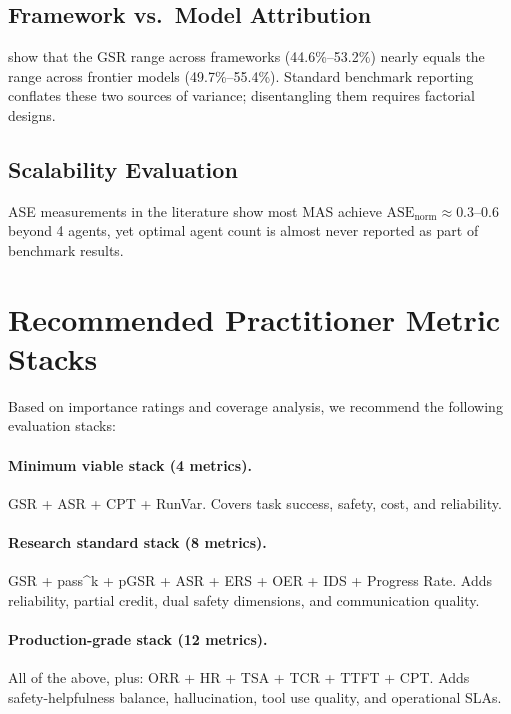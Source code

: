 \documentclass[11pt,a4paper]{article}
\begin{document}
\subsection{Framework vs.\ Model Attribution}

\citet{maseval2025} show that the GSR range across frameworks (44.6\%--53.2\%) nearly
equals the range across frontier models (49.7\%--55.4\%). Standard benchmark reporting
conflates these two sources of variance; disentangling them requires factorial designs.

\subsection{Scalability Evaluation}

ASE measurements in the literature show most MAS achieve $\text{ASE}_{\text{norm}}
\approx 0.3$--$0.6$ beyond 4 agents, yet optimal agent count is almost never reported
as part of benchmark results.

\section{Recommended Practitioner Metric Stacks}
\label{sec:stacks}

Based on importance ratings and coverage analysis, we recommend the following
evaluation stacks:

\paragraph{Minimum viable stack (4 metrics).}
GSR + ASR + CPT + RunVar. Covers task success, safety, cost, and reliability.

\paragraph{Research standard stack (8 metrics).}
GSR + pass\^{}k + pGSR + ASR + ERS + OER + IDS + Progress Rate. Adds reliability,
partial credit, dual safety dimensions, and communication quality.

\paragraph{Production-grade stack (12 metrics).}
All of the above, plus: ORR + HR + TSA + TCR + TTFT + CPT. Adds
safety-helpfulness balance, hallucination, tool use quality, and operational SLAs.
\end{document}
